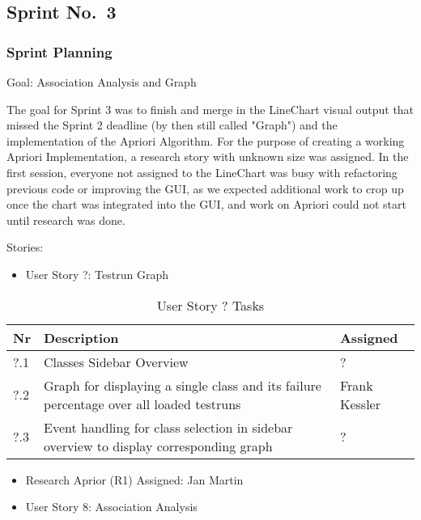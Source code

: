 \subsection{Sprint No.~3}

\subsubsection*{Sprint Planning}

Goal: Association Analysis and Graph

The goal for Sprint 3 was to finish and merge in the LineChart visual output that missed the Sprint 2 deadline (by then still called "Graph") and the implementation of the Apriori Algorithm. 
For the purpose of creating a working Apriori Implementation, a research story with unknown size was assigned. 
In the first session, everyone not assigned to the LineChart was busy with refactoring previous code or improving the GUI, as we expected additional work to crop up once the chart was integrated into the GUI, and work on Apriori could not start until research was done.

Stories: 

\begin{itemize}
	\item User Story ?: Testrun Graph
	\end{itemize}
	
\begin{table}[h]
  \caption{User Story ? Tasks}
  \label{Story ? Tasks}
  \centering
  \begin{tabular}{p{1cm}|p{5cm}|p{3cm}|}
  	Nr & Description & Assigned \\ 
  	\hline
  	?.1 & Classes Sidebar Overview & ? \\ 
  	\hline
  	?.2 & Graph for displaying a single class and its failure percentage over all loaded testruns & Frank Kessler \\ 
  	\hline
  	?.3 & Event handling for class selection in sidebar overview to display corresponding graph & ? \\ 
  	\hline
  \end{tabular}
\end{table}
	
\begin{itemize}	
	\item Research Aprior (R1) Assigned: Jan Martin
\end{itemize}

\newpage
\begin{itemize}
	\item User Story 8: Association Analysis
	\end{itemize}

